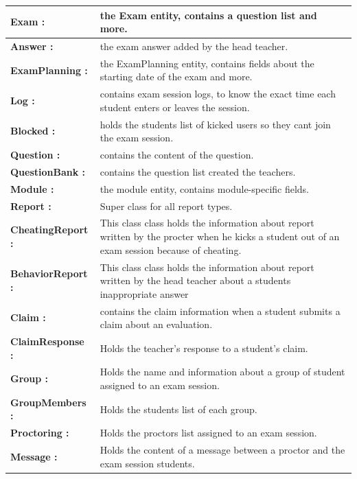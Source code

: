 \documentclass[]{uc2pfecaneva}
\begin{document}
\begin{table}
\begin{tabularx}{\textwidth}{|l|X|}
            \textbf{Exam :} & the Exam entity, contains a question list and more.\\ \hline
            \textbf{Answer :} & the exam answer added by the head teacher.\\ \hline
            \textbf{ExamPlanning :} & the ExamPlanning entity, contains fields about the starting date of the exam and more.\\ \hline
            \textbf{Log :} & contains exam session logs, to know the exact time each student enters or leaves the session.\\ \hline
            \textbf{Blocked :} & holds the students list of kicked users so they cant join the exam session.\\ \hline
            \textbf{Question :} & contains the content of the question.\\ \hline
            \textbf{QuestionBank :} & contains the question list created the teachers.\\ \hline
            \textbf{Module :} & the module entity, contains module-specific fields.\\ \hline
            \textbf{Report :} & Super class for all report types.\\ \hline
            \textbf{CheatingReport :} & This class class holds the information about report written by the procter when he kicks a student out of an exam session because of cheating.\\ \hline
            \textbf{BehaviorReport :} & This class class holds the information about report written by the head teacher about a students inappropriate answer\\ \hline
            \textbf{Claim :} & contains the claim information when a student submits a claim about an evaluation.\\ \hline
            \textbf{ClaimResponse :} & Holds the teacher's response to a student's claim.\\ \hline
            \textbf{Group :} & Holds the name and information about a group of student assigned to an exam session.\\ \hline
            \textbf{GroupMembers :} & Holds the students list of each group.\\ \hline
            \textbf{Proctoring :} & Holds the proctors list assigned to an exam session.\\ \hline
            \textbf{Message :} & Holds the content of a message between a proctor and the exam session students.\\ \hline
        \end{tabularx}
        \label{table:1}
    \end{table}
\end{document}
